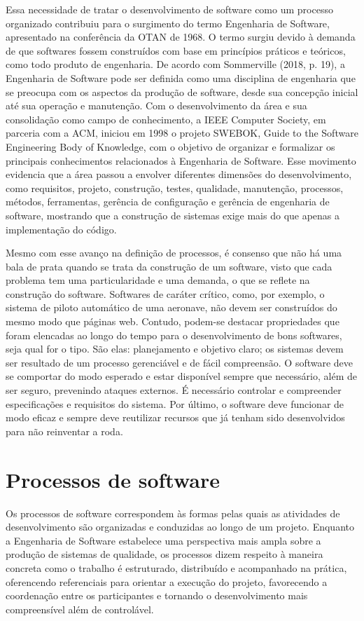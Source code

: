 \documentclass[grad,pdftex]{poli}
\begin{document}
Essa necessidade de tratar o desenvolvimento de software como um processo organizado contribuiu para o surgimento do termo Engenharia de Software, apresentado na conferência da OTAN de 1968. O termo surgiu devido à demanda de que softwares fossem construídos com base em princípios práticos e teóricos, como todo produto de engenharia. De acordo com Sommerville (2018, p. 19), a Engenharia de Software pode ser definida como uma disciplina de engenharia que se preocupa com os aspectos da produção de software, desde sua concepção inicial até sua operação e manutenção. Com o desenvolvimento da área e sua consolidação como campo de conhecimento, a IEEE Computer Society, em parceria com a ACM, iniciou em 1998 o projeto SWEBOK, Guide to the Software Engineering Body of Knowledge, com o objetivo de organizar e formalizar os principais conhecimentos relacionados à Engenharia de Software. Esse movimento evidencia que a área passou a envolver diferentes dimensões do desenvolvimento, como requisitos, projeto, construção, testes, qualidade, manutenção, processos, métodos, ferramentas, gerência de configuração e gerência de engenharia de software, mostrando que a construção de sistemas exige mais do que apenas a implementação do código.

Mesmo com esse avanço na definição de processos, é consenso que não há uma bala de prata quando se trata da construção de um software, visto que cada problema tem uma particularidade e uma demanda, o que se reflete na construção do software. Softwares de caráter crítico, como, por exemplo, o sistema de piloto automático de uma aeronave, não devem ser construídos do mesmo modo que páginas web. Contudo, podem-se destacar propriedades que foram elencadas ao longo do tempo para o desenvolvimento de bons softwares, seja qual for o tipo. São elas: planejamento e objetivo claro; os sistemas devem ser resultado de um processo gerenciável e de fácil compreensão. O software deve se comportar do modo esperado e estar disponível sempre que necessário, além de ser seguro, prevenindo ataques externos. É necessário controlar e compreender especificações e requisitos do sistema. Por último, o software deve funcionar de modo eficaz e sempre deve reutilizar recursos que já tenham sido desenvolvidos para não reinventar a roda.


\section{Processos de software}

Os processos de software correspondem às formas pelas quais as atividades de desenvolvimento são organizadas e conduzidas ao longo de um projeto. Enquanto a Engenharia de Software estabelece uma perspectiva mais ampla sobre a produção de sistemas de qualidade, os processos dizem respeito à maneira concreta como o trabalho é estruturado, distribuído e acompanhado na prática, oferencendo referenciais para orientar a execução do projeto, favorecendo a coordenação entre os participantes e tornando o desenvolvimento mais compreensível além de controlável.
\end{document}
